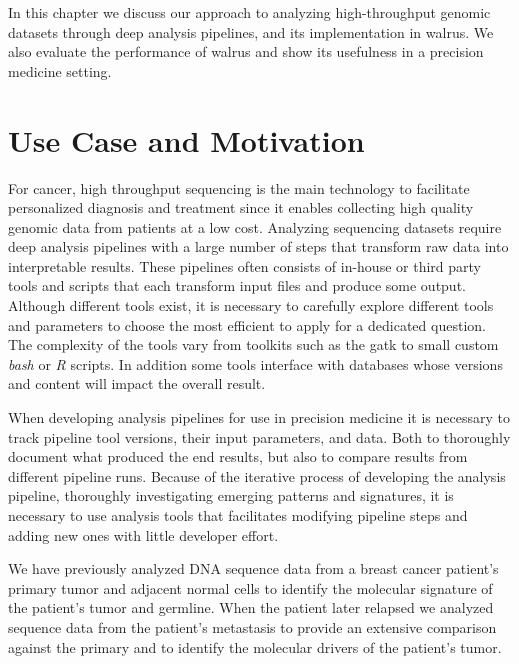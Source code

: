 In this chapter we discuss our approach to analyzing high-throughput genomic
datasets through deep analysis pipelines, and its implementation in 
walrus.\cite{walrus} We also evaluate the performance of walrus and show its
usefulness in a precision medicine setting. 

\section{Use Case and Motivation} 
For cancer, high throughput sequencing is the main technology to facilitate
personalized diagnosis and treatment since it enables collecting high quality
genomic data from patients at a low cost. 
Analyzing sequencing datasets require deep analysis pipelines with a large
number of steps that transform raw data into interpretable
results.\cite{diao2015building} These pipelines often consists of in-house or
third party tools and scripts that each transform input files and produce some
output. Although different tools exist, it is necessary to carefully explore
different tools and parameters to choose the most efficient to apply for a
dedicated question.\cite{servant2014bioinformatics} The complexity of the tools
vary from toolkits such as the \gls{gatk} to small custom \emph{bash} or
\emph{R} scripts.  In addition some tools interface with databases whose
versions and content will impact the overall result.\cite{sboner2015primer}

When developing analysis pipelines for use in precision medicine it is necessary
to track pipeline tool versions, their input parameters, and data. Both to
thoroughly document what produced the end results, but also to compare results
from different pipeline runs.  Because of the iterative process of developing
the analysis pipeline, thoroughly investigating emerging patterns and
signatures, it is necessary to use analysis tools that facilitates modifying
pipeline steps and adding new ones with little developer effort. 

We have previously analyzed DNA sequence data from a breast cancer patient's
primary tumor and adjacent normal cells to identify the molecular signature of
the patient's tumor and germline. When the patient later relapsed we analyzed
sequence data from the patient's metastasis to provide an extensive comparison
against the primary and to identify the molecular drivers of the patient's
tumor. 



